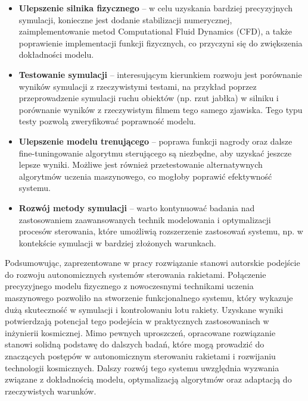 \begin{itemize}
    \item \textbf{Ulepszenie silnika fizycznego} – w celu uzyskania bardziej precyzyjnych symulacji, konieczne jest dodanie stabilizacji numerycznej, zaimplementowanie metod Computational Fluid Dynamics (CFD), a także poprawienie implementacji funkcji fizycznych, co przyczyni się do zwiększenia dokładności modelu.

    \item \textbf{Testowanie symulacji} – interesującym kierunkiem rozwoju jest porównanie wyników symulacji z rzeczywistymi testami, na przykład poprzez przeprowadzenie symulacji ruchu obiektów (np. rzut jabłka) w silniku i porównanie wyników z rzeczywistym filmem tego samego zjawiska. Tego typu testy pozwolą zweryfikować poprawność modelu.

    \item \textbf{Ulepszenie modelu trenującego} – poprawa funkcji nagrody oraz dalsze fine-tuningowanie algorytmu sterującego są niezbędne, aby uzyskać jeszcze lepsze wyniki. Możliwe jest również przetestowanie alternatywnych algorytmów uczenia maszynowego, co mogłoby poprawić efektywność systemu.

    \item \textbf{Rozwój metody symulacji} – warto kontynuować badania nad zastosowaniem zaawansowanych technik modelowania i optymalizacji procesów sterowania, które umożliwią rozszerzenie zastosowań systemu, np. w kontekście symulacji w bardziej złożonych warunkach.
\end{itemize}

Podsumowując, zaprezentowane w pracy rozwiązanie stanowi autorskie podejście
do rozwoju autonomicznych systemów sterowania rakietami. Połączenie
precyzyjnego modelu fizycznego z nowoczesnymi technikami uczenia maszynowego pozwoliło na stworzenie funkcjonalnego systemu, który wykazuje dużą skuteczność w symulacji i kontrolowaniu lotu rakiety. Uzyskane wyniki potwierdzają potencjał tego podejścia w praktycznych zastosowaniach w inżynierii kosmicznej. Mimo pewnych uproszczeń, opracowane rozwiązanie stanowi solidną podstawę do dalszych badań, które mogą prowadzić do znaczących postępów w autonomicznym sterowaniu rakietami i rozwijaniu technologii kosmicznych. Dalszy rozwój tego systemu uwzględnia wyzwania związane z dokładnością modelu, optymalizacją algorytmów oraz adaptacją do rzeczywistych warunków.

